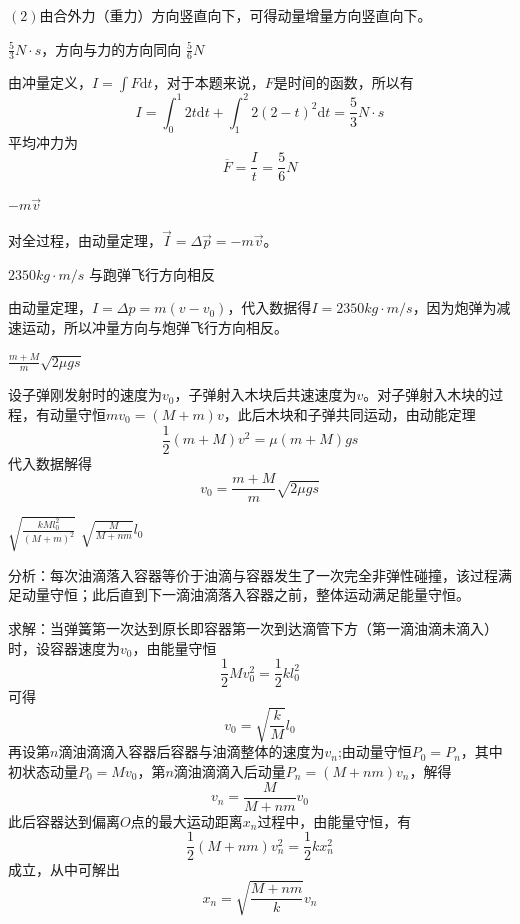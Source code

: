\documentclass[b5paper,opensource]{qyxf-book}
\newcommand{\di}[1]{\mathrm{d}#1}
\begin{document}
$(2)$由合外力（重力）方向竖直向下，可得动量增量方向竖直向下。

$\frac{5}{3}N\cdot s$，方向与力的方向同向 \hspace{2em} $\frac{5}{6}N$

由冲量定义，$I = \int F \di t$，对于本题来说，$F$是时间的函数，所以有
\begin{equation*}
I = \int_0^1 2t \di t + \int_1^2 2(2-t)^2 \di t = \frac{5}{3}N \cdot s
\end{equation*}
平均冲力为
\begin{equation*}
\overline{F} = \frac{I}{t} = \frac{5}{6} N
\end{equation*}

$-m\vec{v}$

对全过程，由动量定理，$\vec{I} = \Delta \vec{p} = -m\vec{v}$。

$2350kg\cdot m/s$ \hspace{2em} 与跑弹飞行方向相反

由动量定理，$I = \Delta p = m(v-v_0)$，代入数据得$I=2350kg\cdot m/s$，因为炮弹为减速运动，所以冲量方向与炮弹飞行方向相反。

$\frac{m+M}{m}\sqrt{2 \mu gs}$

设子弹刚发射时的速度为$v_0$，子弹射入木块后共速速度为$v$。对子弹射入木块的过程，有动量守恒$mv_0=(M+m)v$，此后木块和子弹共同运动，由动能定理
\begin{equation*}
\frac{1}{2}(m+M)v^2=\mu (m+M)gs
\end{equation*}
代入数据解得
\begin{equation*}
v_0=\frac{m+M}{m}\sqrt{2 \mu gs}
\end{equation*}

$\sqrt{\frac{kMl_0^2}{(M+m)^2}}$ \hspace{4em} $\sqrt{\frac{M}{M+nm}}l_0$

分析：每次油滴落入容器等价于油滴与容器发生了一次完全非弹性碰撞，该过程满足动量守恒；此后直到下一滴油滴落入容器之前，整体运动满足能量守恒。

求解：当弹簧第一次达到原长即容器第一次到达滴管下方（第一滴油滴未滴入）时，设容器速度为$v_0$，由能量守恒
\begin{equation*}
\frac{1}{2}Mv_0^2=\frac{1}{2}kl_0^2
\end{equation*}
可得
\begin{equation*}
v_0=\sqrt{\frac{k}{M}}l_0
\end{equation*}
再设第$n$滴油滴滴入容器后容器与油滴整体的速度为$v_n$;由动量守恒$P_0=P_n$，其中初状态动量$P_0=Mv_0$，第$n$滴油滴滴入后动量$P_n=(M+nm)v_n$，解得
\begin{equation*}
v_n=\frac{M}{M+nm}v_0
\end{equation*}
此后容器达到偏离$O$点的最大运动距离$x_n$过程中，由能量守恒，有
\begin{equation*}
\frac{1}{2}(M+nm)v_n^2=\frac{1}{2}kx_n^2
\end{equation*}
成立，从中可解出
\begin{equation*}
x_n=\sqrt{\frac{M+nm}{k}}v_n
\end{equation*}
\end{document}
